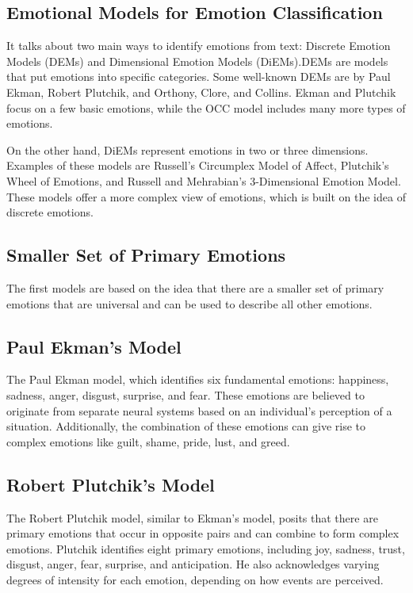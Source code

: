 \documentclass[11pt]{article}
\begin{document}
\begin{multicols*}{2}
    \section*{Emotional Models for Emotion Classification}
    \par It talks about two main ways to identify emotions from text: Discrete Emotion Models (DEMs) and Dimensional Emotion Models (DiEMs).DEMs are models that put emotions into specific categories. Some well-known DEMs are by Paul Ekman, Robert Plutchik, and Orthony, Clore, and Collins. Ekman and Plutchik focus on a few basic emotions, while the OCC model includes many more types of emotions.
    \par On the other hand, DiEMs represent emotions in two or three dimensions. Examples of these models are Russell’s Circumplex Model of Affect, Plutchik’s Wheel of Emotions, and Russell and Mehrabian’s 3-Dimensional Emotion Model. These models offer a more complex view of emotions, which is built on the idea of discrete emotions. 
    \subsection*{Smaller Set of Primary Emotions}
    \par The first models are based on the idea that there are a smaller set of primary emotions that are universal and can be used to describe all other emotions. 
    \subsection*{Paul Ekman's Model}
    \par The Paul Ekman model, which identifies six fundamental emotions: happiness, sadness, anger, disgust, surprise, and fear. These emotions are believed to originate from separate neural systems based on an individual's perception of a situation. Additionally, the combination of these emotions can give rise to complex emotions like guilt, shame, pride, lust, and greed. \cite{ekman1999basic}
    \subsection*{Robert Plutchik's Model}
    \par The Robert Plutchik model, similar to Ekman's model, posits that there are primary emotions that occur in opposite pairs and can combine to form complex emotions. Plutchik identifies eight primary emotions, including joy, sadness, trust, disgust, anger, fear, surprise, and anticipation. He also acknowledges varying degrees of intensity for each emotion, depending on how events are perceived. \cite{plutchik1980general}

\end{multicols*}
\end{document}
